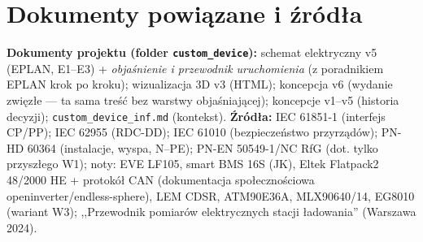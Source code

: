 \documentclass[11pt,a4paper]{article}
\begin{document}
\section{Dokumenty powiązane i źródła}
\textbf{Dokumenty projektu (folder \texttt{custom\_device}):} schemat elektryczny v5 (EPLAN,
E1--E3) + \emph{objaśnienie i przewodnik uruchomienia} (z poradnikiem EPLAN krok po kroku);
wizualizacja 3D v3 (HTML); koncepcja v6 (wydanie zwięzłe --- ta sama treść bez warstwy
objaśniającej); koncepcje v1--v5 (historia decyzji); \texttt{custom\_device\_inf.md} (kontekst).
\textbf{Źródła:} IEC 61851-1 (interfejs CP/PP); IEC 62955 (RDC-DD); IEC 61010 (bezpieczeństwo
przyrządów); PN-HD 60364 (instalacje, wyspa, N--PE); PN-EN 50549-1/NC RfG (dot. tylko przyszłego
W1); noty: EVE LF105, smart BMS 16S (JK), Eltek Flatpack2 48/2000 HE + protokół CAN (dokumentacja
społecznościowa openinverter/endless-sphere), LEM CDSR, ATM90E36A, MLX90640/14, EG8010 (wariant
W3); ,,Przewodnik pomiarów elektrycznych stacji ładowania'' (Warszawa 2024).
\end{document}
